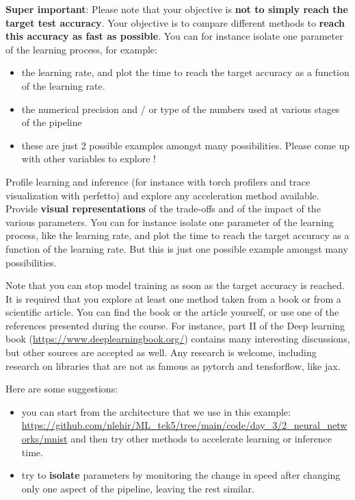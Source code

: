 \documentclass[
10pt, %
a4paper, %
oneside, %
headinclude,footinclude, %
BCOR5mm, %
]{scrartcl}
\begin{document}
\textbf{Super important}: Please note that your objective is \textbf{not to simply reach the target test accuracy}. Your objective is to compare different methods to \textbf{reach this accuracy as fast as possible}. You can for instance isolate one parameter of the learning process, for example:
\begin{itemize}
    \item the learning rate, and plot the time to reach the target accuracy as a function of the learning rate. 
    \item the numerical precision and / or type of the numbers used at various stages of the pipeline
    \item these are just 2 possible examples amongst many possibilities. Please come up with other variables to explore !
\end{itemize}
Profile learning and inference (for instance with torch profilers and trace visualization with perfetto) and explore any acceleration method available. Provide \textbf{visual representations} of the trade-offs and of the impact of the various parameters. You can for instance isolate one parameter of the learning process, like the learning rate, and plot the time to reach the target accuracy as a function of the learning rate. But this is just one possible example amongst many possibilities.

Note that you can stop model training as soon as the target accuracy is reached.
\\

It is required that you explore at least one method taken from a book or from a scientific article. You can find the book or the article yourself, or use one of the references presented during the course. For instance, part II of the Deep learning book (\url{https://www.deeplearningbook.org/}) contains many interesting discussions, but other sources are accepted as well. Any research is welcome, including research on libraries that are not as famous as pytorch and tensforflow, like jax.

Here are some suggestions:
\begin{itemize}
	\item you can start from the architecture that we use in this example:
	    \url{https://github.com/nlehir/ML_tek5/tree/main/code/day_3/2_neural_networks/mnist} 
	    and then try other methods to accelerate learning or inference time.
	\item try to \textbf{isolate} parameters by monitoring the change in speed after changing only one aspect of the pipeline, leaving the rest similar.
\end{itemize}
\end{document}
